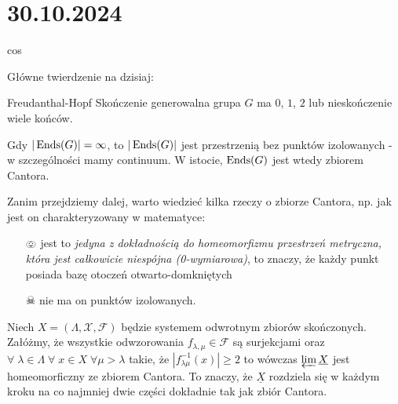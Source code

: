 \section{30.10.2024}{cos}



Główne twierdzenie na dzisiaj:
\begin{theorem}{Freudanthal-Hopf}{}
  Skończenie generowalna grupa $G$ ma $0$, $1$, $2$ lub nieskończenie wiele końców.

  Gdy $|\operatorname{Ends}(G)|=\infty$, to $|\operatorname{Ends}(G)|$ jest przestrzenią bez punktów izolowanych - w szczególności mamy continuum. W istocie, $\operatorname{Ends}(G)$ jest wtedy zbiorem Cantora.
\end{theorem}

Zanim przejdziemy dalej, warto wiedzieć kilka rzeczy o zbiorze Cantora, np. jak jest on charakteryzowany w matematyce:
\begin{itemize}
  \item[$\pumpkin$] jest to {\slshape jedyna z dokładnością do homeomorfizmu przestrzeń metryczna, która jest całkowicie niespójna (0-wymiarowa)}, to znaczy, że każdy punkt posiada bazę otoczeń otwarto-domkniętych 
  \item[$\skull$] nie ma on punktów izolowanych.
\end{itemize}

Niech $X=(\Lambda, \mathcal{X}, \mathcal{F})$ będzie systemem odwrotnym zbiorów skończonych. Załóżmy, że wszystkie odwzorowania $f_{\lambda,\mu}\in\mathcal{F}$ są surjekcjami oraz $\forall\;\lambda\in\Lambda\;\forall\;x\in X\;\forall\mu>\lambda$ takie, że $|f^{-1}_{\lambda\mu}(x)|\geq 2$ to wówczas $\varprojlim \underline{X}$ jest homeomorficzny ze zbiorem Cantora. To znaczy, że $\underline{X}$ rozdziela się w każdym kroku na co najmniej dwie części dokładnie tak jak zbiór Cantora.

